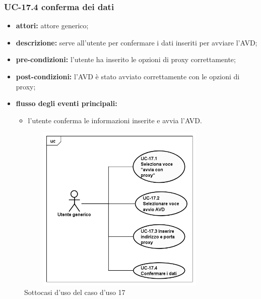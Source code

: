\subsubsection*{UC-17.4 conferma dei dati}
\begin{itemize}
    \item \textbf{attori:} attore generico;
    \item \textbf{descrizione:} serve all'utente per confermare i dati inseriti per avviare l'AVD;
    \item \textbf{pre-condizioni:} l'utente ha inserito le opzioni di proxy correttamente;
    \item \textbf{post-condizioni:} l'AVD è stato avviato correttamente con le opzioni di proxy;
    \item \textbf{flusso degli eventi principali:}
    \begin{itemize}
        \item l'utente conferma le informazioni inserite e avvia l'AVD.
    \end{itemize}
\end{itemize}

\begin{figure}[H]
    \centering
    \includegraphics[width=10cm, height=8cm]{./immagini/usecase/uc_17.png}
    \caption{Sottocasi d'uso del caso d'uso 17}
\end{figure}
